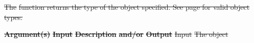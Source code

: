 \documentclass[12pt]{report} %
\providecommand{\DIFdeltex}[1]{{\protect\color{red}\sout{#1}}}                      %
\providecommand{\DIFdelend}{} %
\providecommand{\DIFdel}[1]{\texorpdfstring{\DIFdeltex{#1}}{}} %
\DeclareRobustCommand{\DIFdelend}{\DIFOaddend \let\includegraphics\DIFOincludegraphics} %
\begin{document}
\DIFdel{The }%
\DIFdel{function returns the type of the object specified. 
See page \pageref{type:ObjType} for valid object types.
}%


\textbf{\DIFdel{Argument(s)}} %
\textbf{\DIFdel{Input }}  %
\textbf{\DIFdel{Description}} %
\textbf{\DIFdel{and/or}}     %
\textbf{\DIFdel{Output}} %
\DIFdel{Input  }%
\DIFdel{The object }\DIFdelend %
\end{document}

